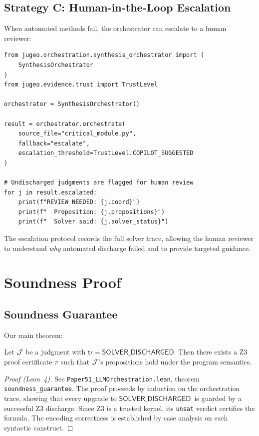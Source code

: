 \documentclass[11pt]{article}
\newcommand{\SolverDisch}{\ensuremath{\mathsf{SOLVER\_DISCHARGED}}}
\newcommand{\tr}{\mathsf{tr}}                        %
\begin{document}
\subsection{Strategy C: Human-in-the-Loop Escalation}

When automated methods fail, the orchestrator can escalate to a
human reviewer:

\begin{lstlisting}[style=jugeo-python]
from jugeo.orchestration.synthesis_orchestrator import (
    SynthesisOrchestrator
)
from jugeo.evidence.trust import TrustLevel

orchestrator = SynthesisOrchestrator()

result = orchestrator.orchestrate(
    source_file="critical_module.py",
    fallback="escalate",
    escalation_threshold=TrustLevel.COPILOT_SUGGESTED
)

# Undischarged judgments are flagged for human review
for j in result.escalated:
    print(f"REVIEW NEEDED: {j.coord}")
    print(f"  Proposition: {j.propositions}")
    print(f"  Solver said: {j.solver_status}")
\end{lstlisting}

The escalation protocol records the full solver trace, allowing the
human reviewer to understand \emph{why} automated discharge failed and
to provide targeted guidance.

\section{Soundness Proof}\label{sec:soundness-proof}

\subsection{Soundness Guarantee}
Our main theorem:

\begin{theorem}\label{thm:soundness}
Let $\mathcal{J}$ be a judgment with $\tr = \SolverDisch$. Then there exists a Z3 
proof certificate $\pi$ such that $\mathcal{J}$'s propositions hold under the 
program semantics.
\end{theorem}

\begin{proof}[Proof (Lean~4)]
See \texttt{Paper51\_LLMOrchestration.lean}, theorem 
\texttt{soundness\_guarantee}. The proof proceeds by induction on the 
orchestration trace, showing that every upgrade to \SolverDisch\ is guarded 
by a successful Z3 discharge. Since Z3 is a trusted kernel, its \texttt{unsat} 
verdict certifies the formula. The encoding correctness is established by 
case analysis on each syntactic construct.
\end{proof}
\end{document}
